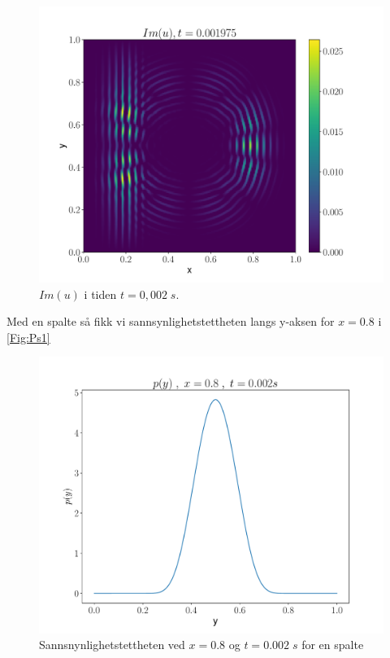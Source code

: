 \documentclass[reprint,english,notitlepage]{revtex4-2}  %
\begin{document}
\begin{figure}[H]
\centering
\includegraphics[scale=0.45, trim={3cm 0 0 0}]{../Images/ImshowIm0001975sl2.pdf}
\caption{$Im(u) $ i tiden $t = 0,002 \; s$.}
\label{Fig:s2Imt02}
\end{figure}

Med en spalte så fikk vi sannsynlighetstettheten langs y-aksen for $x = 0.8$ i \autoref{Fig:Ps1}

\begin{figure}[H]
\centering
\includegraphics[scale=0.4]{../Images/ScreenProb1Slit.pdf}
\caption{Sannsnynlighetstettheten ved $x = 0.8$ og $t = 0.002 \; s$ for en spalte}
\label{Fig:Ps1}
\end{figure}
\end{document}

